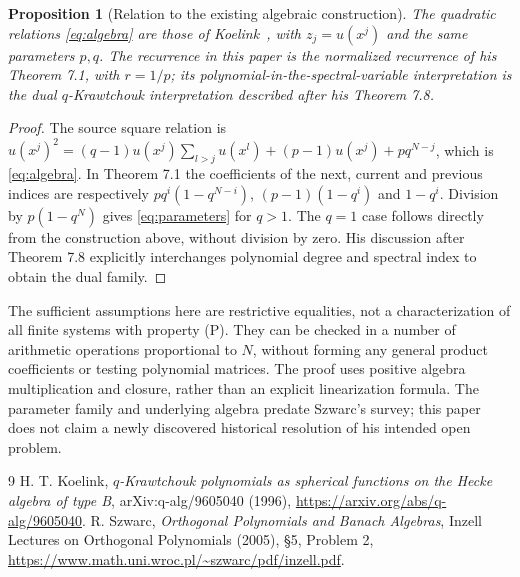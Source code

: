 \documentclass[11pt]{article}
\newtheorem{proposition}[theorem]{Proposition}
\begin{document}
\begin{proposition}[Relation to the existing algebraic construction]\label{prop:source}
The quadratic relations \eqref{eq:algebra} are those of Koelink~\cite[Theorem 3.1(ii), equation (3.3)]{koelink}, with $z_j=u(x^j)$ and the same parameters $p,q$. The recurrence in this paper is the normalized recurrence of his Theorem 7.1, with $r=1/p$; its polynomial-in-the-spectral-variable interpretation is the dual $q$-Krawtchouk interpretation described after his Theorem 7.8.
\end{proposition}
\begin{proof}
The source square relation is $u(x^j)^2=(q-1)u(x^j)\sum_{l>j}u(x^l)+(p-1)u(x^j)+pq^{N-j}$, which is \eqref{eq:algebra}. In Theorem 7.1 the coefficients of the next, current and previous indices are respectively $pq^i(1-q^{N-i})$, $(p-1)(1-q^i)$ and $1-q^i$. Division by $p(1-q^N)$ gives \eqref{eq:parameters} for $q>1$. The $q=1$ case follows directly from the construction above, without division by zero. His discussion after Theorem 7.8 explicitly interchanges polynomial degree and spectral index to obtain the dual family.
\end{proof}

The sufficient assumptions here are restrictive equalities, not a characterization of all finite systems with property (P). They can be checked in a number of arithmetic operations proportional to $N$, without forming any general product coefficients or testing polynomial matrices. The proof uses positive algebra multiplication and closure, rather than an explicit linearization formula. The parameter family and underlying algebra predate Szwarc's survey; this paper does not claim a newly discovered historical resolution of his intended open problem.

\begin{thebibliography}{9}
 H. T. Koelink, \emph{$q$-Krawtchouk polynomials as spherical functions on the Hecke algebra of type B}, arXiv:q-alg/9605040 (1996), \url{https://arxiv.org/abs/q-alg/9605040}.
 R. Szwarc, \emph{Orthogonal Polynomials and Banach Algebras}, Inzell Lectures on Orthogonal Polynomials (2005), \S5, Problem 2, \url{https://www.math.uni.wroc.pl/~szwarc/pdf/inzell.pdf}.
\end{thebibliography}
\end{document}
